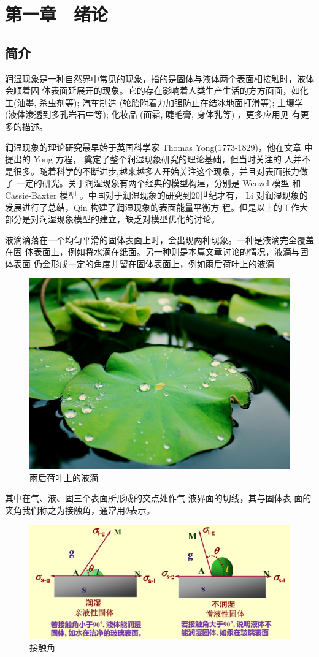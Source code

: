 \documentclass[12pt,oneside,a4paper]{article}
\newcommand{\xiaosihao}{\fontsize{12pt}{20pt}\selectfont}
\newcommand{\wuhao}{\fontsize{10.5pt}{20pt}\selectfont}
\begin{document}
\noindent \xiaosihao{\textbf{Key words:}}
\wuhao{Wetting phenomenon; Nonlinear optimization algorithm; Numerical simulation}



\newpage

\section{第一章　绪论}
\subsection{简介}
润湿现象是一种自然界中常见的现象，指的是固体与液体两个表面相接触时，液体会顺着固
体表面延展开的现象。它的存在影响着人类生产生活的方方面面，如化工(油墨, 杀虫剂等);
汽车制造 (轮胎附着力加强防止在结冰地面打滑等); 土壤学 (液体渗透到多孔岩石中等);
化妆品 (面霜, 睫毛膏, 身体乳等) ，更多应用见 \cite{meng} 有更多的描述。

润湿现象的理论研究最早始于英国科学家 Thomas Yong(1773-1829)，他在文章
\cite{young} 中提出的 Yong 方程， 奠定了整个润湿现象研究的理论基础，但当时关注的
人并不是很多。随着科学的不断进步,越来越多人开始关注这个现象，并且对表面张力做了
一定的研究。关于润湿现象有两个经典的模型构建，分别是 Wenzel 模型 \cite{wenzel} 和
Cassie-Baxter 模型 \cite{cassie}。中国对于润湿现象的研究到20世纪才有，
Li\cite{li} 对润湿现象的发展进行了总结，Qin\cite{qin} 构建了润湿现象的表面能量平衡方
程。但是以上的工作大部分是对润湿现象模型的建立，缺乏对模型优化的讨论。

液滴滴落在一个均匀平滑的固体表面上时，会出现两种现象。一种是液滴完全覆盖在固
体表面上，例如将水滴在纸面。另一种则是本篇文章讨论的情况，液滴与固体表面
仍会形成一定的角度并留在固体表面上，例如雨后荷叶上的液滴

\begin{figure}[H]
	\centering
	\includegraphics[width=0.3\linewidth]{figure/lotus.jpg}
	\caption{雨后荷叶上的液滴}
	\label{fig:7}
\end{figure}

\noindent 其中在气、液、固三个表面所形成的交点处作气-液界面的切线，其与固体表
面的夹角我们称之为接触角，通常用$\theta$表示。

\begin{figure}[H]
	\centering
	\includegraphics[width=0.5\linewidth]{figure/contact-angel.png}
	\caption{接触角}
	\label{fig:8}
\end{figure}
\end{document}
